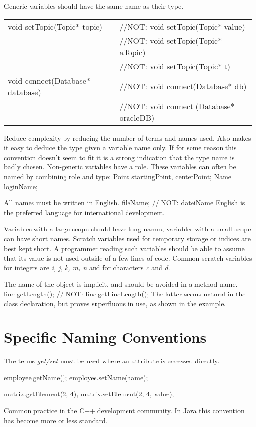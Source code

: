 \recommendation
{Generic variables should have the same name as their type.}
{
	\begin{tabularx}{\textwidth}{l l}
	 void setTopic(Topic* topic) &//NOT: void setTopic(Topic* value) \\
	 &//NOT: void setTopic(Topic* aTopic) \\
	 &//NOT: void setTopic(Topic* t) \\
	 void connect(Database* database) &//NOT: void connect(Database* db) \\
	 &//NOT: void connect (Database* oracleDB)
	\end{tabularx}
}
{Reduce complexity by reducing the number of terms and names used. Also makes it easy to deduce the type given a variable name only.\newline
If for some reason this convention doesn't seem to fit it is a strong indication that the type name is badly chosen.\newline
Non-generic variables have a role. These variables can often be named by combining role and type:\newline
Point  startingPoint, centerPoint;\newline
Name   loginName;\newline
}

\recommendation
{All names must be written in English.}
{fileName; // NOT: dateiName}
{English is the preferred language for international development.}

\recommendation
{Variables with a large scope should have long names, variables with a small scope can have short names.}
{}
{Scratch variables used for temporary storage or indices are best kept short. A programmer reading such variables should be able to assume that its value is not used outside of a few lines of code. Common scratch variables for integers are \textit{i, j, k, m, n} and for characters \textit{c} and \textit{d}.}

\recommendation
{The name of the object is implicit, and should be avoided in a method name.}
{line.getLength(); // NOT: line.getLineLength();}
{The latter seems natural in the class declaration, but proves superfluous in use, as shown in the example.}

\section{Specific Naming Conventions}

\recommendation
{The terms \textit{get/set} must be used where an attribute is accessed directly.}
{
	employee.getName();\newline
	employee.setName(name);\newline
	
	matrix.getElement(2, 4);\newline
	matrix.setElement(2, 4, value);
}
{Common practice in the C++ development community. In Java this convention has become more or less standard.}

